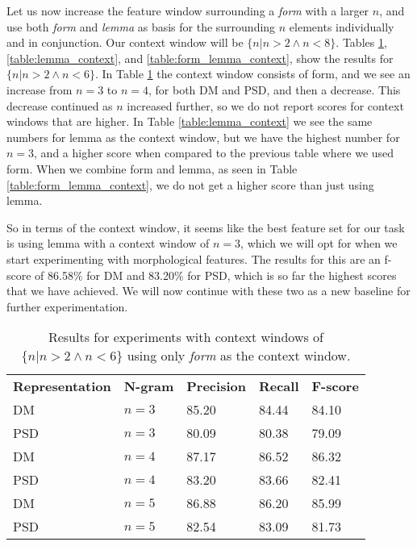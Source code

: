 Let us now increase the feature window surrounding a \textit{form} with a larger $n$, and use both \textit{form} and \textit{lemma} as basis for the surrounding $n$ elements individually and in conjunction. Our context window will be ${\{n|n>2 \wedge n<8\}}$. Tables \ref{table:form_context}, \ref{table:lemma_context}, and \ref{table:form_lemma_context}, show the results for ${\{n|n>2 \wedge n<6\}}$. In Table \ref{table:form_context} the context window consists of form, and we see an increase from $n=3$ to $n=4$, for both DM and PSD, and then a decrease. This decrease continued as $n$ increased further, so we do not report scores for context windows that are higher. In Table \ref{table:lemma_context} we see the same numbers for lemma as the context window, but we have the highest number for $n=3$, and a higher score when compared to the previous table where we used form. When we combine form and lemma, as seen in Table \ref{table:form_lemma_context}, we do not get a higher score than just using lemma. 

So in terms of the context window, it seems like the best feature set for our task is using lemma with a context window of $n=3$, which we will opt for when we start experimenting with morphological features. The results for this are an f-score of 86.58\% for DM and 83.20\% for PSD, which is so far the highest scores that we have achieved. We will now continue with these two as a new baseline for further experimentation.

\begin{table}
    \centering
    \smaller[0.2]
    \begin{tabular}{@{}lllll@{}}
        \toprule
        \textbf{Representation} & \textbf{N-gram} & \textbf{Precision} & \textbf{Recall} & \textbf{F-score} \\
        DM & $n=3$ & 85.20 & 84.44 & 84.10 \\
        PSD & $n=3$ & 80.09 & 80.38 & 79.09 \\
        \midrule
        DM & $n=4$  & 87.17 & 86.52 & 86.32 \\
        PSD & $n=4$ & 83.20 & 83.66 & 82.41 \\
        \midrule
        DM & $n=5$  & 86.88 & 86.20 & 85.99 \\
        PSD & $n=5$ & 82.54 & 83.09 & 81.73 \\
        \bottomrule
    \end{tabular}
    \caption{Results for experiments with context windows of ${\{n|n>2 \wedge n<6\}}$ using only \textit{form} as the context window.}
    \label{table:form_context}
\end{table}

